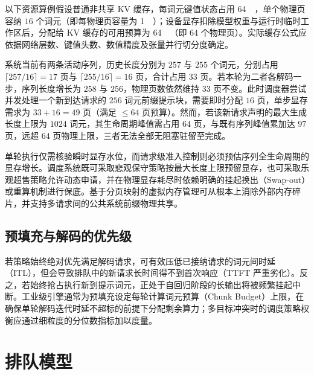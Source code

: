 \documentclass[../textbook.tex]{subfiles}
\begin{document}
\begin{example}
\begin{assumption}
以下资源算例假设普通非共享 KV 缓存，每词元键值状态占用 \qty{64}{\kibi\byte}，单个物理页容纳 $16$ 个词元（即每物理页容量为 \qty{1}{\mebi\byte}）；设备显存扣除模型权重与运行时临时工作区后，分配给 KV 缓存的可用预算为 \qty{64}{\mebi\byte}（即 $64$ 个物理页）。实际缓存公式应依据网络层数、键值头数、数值精度及张量并行切分度确定。
\end{assumption}

系统当前有两条活动序列，历史长度分别为 $257$ 与 $255$ 个词元，分别占用 $\lceil 257/16\rceil=17$ 页与 $\lceil 255/16\rceil=16$ 页，合计占用 $33$ 页。若本轮为二者各解码一步，序列长度增长为 $258$ 与 $256$，物理页数依然维持 $33$ 页不变。此时调度器尝试并发处理一个新到达请求的 $256$ 词元前缀提示块，需要即时分配 $16$ 页，单步显存需求为 $33+16=49$ 页（满足 $\le 64$ 页预算）。然而，若该新请求声明的最大生成长度上限为 $1024$ 词元，其生命周期峰值需占用 $64$ 页，与既有序列峰值累加达 $97$ 页，远超 $64$ 页物理上限，三者无法全部无阻塞驻留至完成。

单轮执行仅需核验瞬时显存水位，而请求级准入控制则必须预估序列全生命周期的显存增长。调度系统既可采取悲观保守策略按最大长度上限预留显存，也可采取乐观超售策略允许动态申请，并在物理显存耗尽时依赖明确的挂起换出（Swap-out）或重算机制进行保底。基于分页映射的虚拟内存管理可从根本上消除外部内存碎片，并支持多请求间的公共系统前缀物理共享\cite{kwon2023pagedattention}。
\end{example}

\subsection{预填充与解码的优先级}
若策略始终绝对优先满足解码请求，可有效压低已接纳请求的词元间时延（ITL），但会导致排队中的新请求长时间得不到首次响应（TTFT 严重劣化）。反之，若始终抢占执行新到提示词元，正处于自回归阶段的长输出将被频繁挂起中断。工业级引擎通常为预填充设定每轮计算词元预算（Chunk Budget）上限，在确保单轮解码迭代时延不超标的前提下分配剩余算力；多目标冲突时的调度策略权衡应通过细粒度的分位数指标加以度量。

\section{排队模型}
\end{document}
